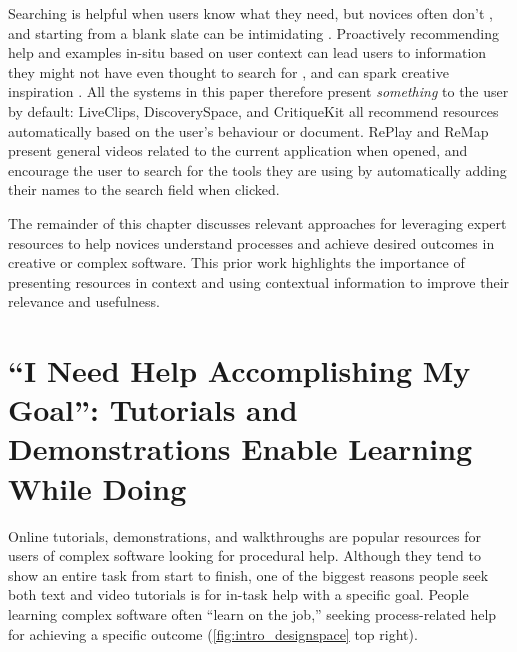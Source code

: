 Searching is helpful when users know what they need, but novices often don't \cite{Miyake1979}, and starting from a blank slate can be intimidating \cite{Kelley2013}. Proactively recommending help and examples in-situ based on user context can lead users to information they might not have even thought to search for \cite{Matejka2009, Chilana2012, Matejka2011, Ichinco2017}, and can spark creative inspiration \cite{Bawden1986, Kulkarni2014, Herring2009}. All the systems in this paper therefore present \textit{something} to the user by default: LiveClips, DiscoverySpace, and CritiqueKit all recommend resources automatically based on the user's behaviour or document. RePlay and ReMap present general videos related to the current application when opened, and encourage the user to search for the tools they are using by automatically adding their names to the search field when clicked. 

The remainder of this chapter discusses relevant approaches for leveraging expert resources to help novices understand processes and achieve desired outcomes in creative or complex software. This prior work highlights the importance of presenting resources in context and using contextual information to improve their relevance and usefulness. 

\section{``I Need Help Accomplishing My Goal'': Tutorials and De\-monstrations Enable Learning While Doing}
Online tutorials, demonstrations, and walkthroughs are popular resources for users of complex software looking for procedural help. Although they tend to show an entire task from start to finish, one of the biggest reasons people seek both text \cite{Lafreniere2013a} and video \cite{AlamAnik2015} tutorials is for in-task help with a specific goal. People learning complex software often ``learn on the job,'' seeking process-related help for achieving a specific outcome (\autoref{fig:intro_designspace} top right).

